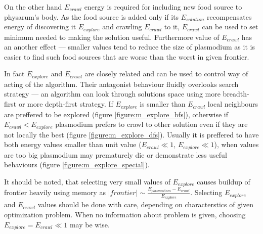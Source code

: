 On the other hand $E_{crawl}$ energy is required for including new food source to physarum's body. As the food source is added only if its $E_{solution}$ recompensates energy of discovering it $E_{explore}$ and crawling $E_{crawl}$ to it, $E_{crawl}$ can be used to set minimum needed to making the solution useful. Furthermore value of $E_{crawl}$ has an another effect --- smaller values tend to reduce the size of plasmodium as it is easier to find such food sources that are worse than the worst in given frontier.

In fact $E_{explore}$ and $E_{crawl}$ are closely related and can be used to control way of acting of the algorithm. Their antagonist behaviour fluidly overlooks search strategy --- an algorithm can look through solutions space using more breadth-first or more depth-first strategy. If $E_{explore}$ is smaller than $E_{crawl}$ local neighbours are preffered to be explored (figure \ref{figure:m_explore_bfs}), otherwise if $E_{crawl} < E_{explore}$ plasmodium prefers to crawl to other solution even if they are not locally the best (figure \ref{figure:m_explore_dfs}). Usually it is preffered to have both energy values smaller than unit value ($E_{crawl} \ll 1$, $E_{explore} \ll 1$), when values are too big plasmodium may prematurely die or demonstrate less useful behaviours (figure \ref{figure:m_explore_special}).


It should be noted, that selecting very small values of $E_{explore}$ causes buildup of frontier heavily using memory as $|frontier| \sim \frac{E_{plasmodium} - E_{crawl}}{E_{explore}}$. Selecting $E_{explore}$ and $E_{crawl}$ values should be done with care, depending on characterstics of given optimization problem. When no information about problem is given, choosing $E_{explore} = E_{crawl} \ll 1$ may be wise. 

